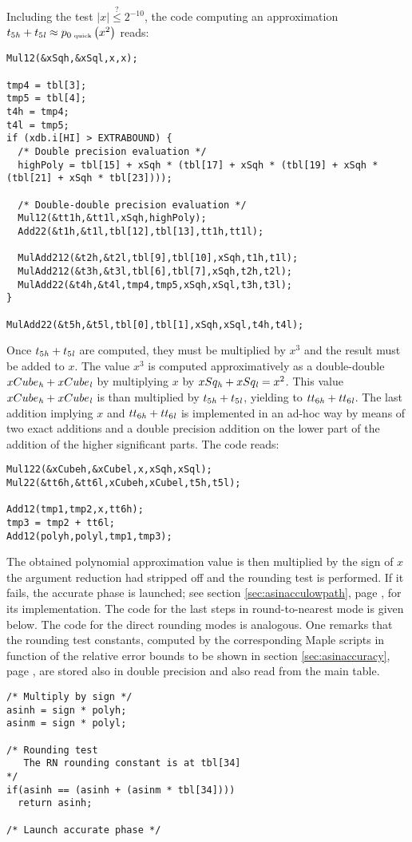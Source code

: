 Including the test $\left \vert x \right \vert \stackrel{?}{\leq} 2^{-10}$, the code computing 
an approximation $t_{5\mathit{h}} + t_{5\mathit{l}} \approx p_{0\mbox{\tiny ~quick}}\left( x^2 \right)$ reads:
\begin{lstlisting}[caption={Low path quick phase polynomial approximation (higher degrees)},firstnumber=1]
Mul12(&xSqh,&xSql,x,x);

tmp4 = tbl[3];
tmp5 = tbl[4];
t4h = tmp4;
t4l = tmp5;
if (xdb.i[HI] > EXTRABOUND) {
  /* Double precision evaluation */
  highPoly = tbl[15] + xSqh * (tbl[17] + xSqh * (tbl[19] + xSqh * (tbl[21] + xSqh * tbl[23])));

  /* Double-double precision evaluation */
  Mul12(&tt1h,&tt1l,xSqh,highPoly);
  Add22(&t1h,&t1l,tbl[12],tbl[13],tt1h,tt1l);
  
  MulAdd212(&t2h,&t2l,tbl[9],tbl[10],xSqh,t1h,t1l);
  MulAdd212(&t3h,&t3l,tbl[6],tbl[7],xSqh,t2h,t2l);
  MulAdd22(&t4h,&t4l,tmp4,tmp5,xSqh,xSql,t3h,t3l);
}

MulAdd22(&t5h,&t5l,tbl[0],tbl[1],xSqh,xSql,t4h,t4l);
\end{lstlisting}
Once $t_{5\mathit{h}} + t_{5\mathit{l}}$ are computed, they must be multiplied by
$x^3$ and the result must be added to $x$.  The value $x^3$ is
computed approximatively as a double-double $xCube_{\mathit{h}} + xCube_{\mathit{l}}$ by
multiplying $x$ by $xSq_{\mathit{h}} + xSq_{\mathit{l}} = x^2$. This value $xCube_{\mathit{h}} +
xCube_{\mathit{l}}$ is than multiplied by $t_{5\mathit{h}} + t_{5\mathit{l}}$, yielding to
$tt_{6\mathit{h}} + tt_{6\mathit{l}}$. The last addition implying $x$ and $tt_{6\mathit{h}}
+ tt_{6\mathit{l}}$ is implemented in an ad-hoc way by means of two exact
additions and a double precision addition on the lower part of the
addition of the higher significant parts. The code reads:
\begin{lstlisting}[caption={Low path quick phase polynomial approximation (lower degrees)},firstnumber=1]
Mul122(&xCubeh,&xCubel,x,xSqh,xSql);
Mul22(&tt6h,&tt6l,xCubeh,xCubel,t5h,t5l);

Add12(tmp1,tmp2,x,tt6h);
tmp3 = tmp2 + tt6l;
Add12(polyh,polyl,tmp1,tmp3);
\end{lstlisting} 
The obtained polynomial approximation value is then multiplied by the
sign of $x$ the argument reduction had stripped off and the rounding
test is performed.  If it fails, the accurate phase is launched; see
section \ref{sec:asinacculowpath}, page \pageref{sec:asinacculowpath},
for its implementation.  The code for the last steps in
round-to-nearest mode is given below. The code for the direct rounding
modes is analogous. One remarks that the rounding test constants,
computed by the corresponding Maple scripts in function of the
relative error bounds to be shown in section \ref{sec:asinaccuracy},
page \pageref{sec:asinaccuracy}, are stored also in double precision
and also read from the main table.
\begin{lstlisting}[caption={Low path quick phase rounding test},firstnumber=1]
/* Multiply by sign */
asinh = sign * polyh;
asinm = sign * polyl;

/* Rounding test 
   The RN rounding constant is at tbl[34]
*/
if(asinh == (asinh + (asinm * tbl[34]))) 
  return asinh;

/* Launch accurate phase */
\end{lstlisting} 

